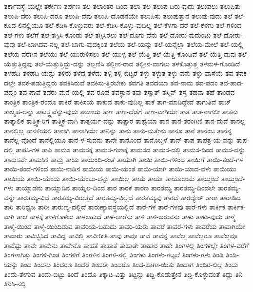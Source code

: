 {ತರ್ಕಾವಸ್ಥೆ-ಯಲ್ಲೇ
ತರ್ಕೇಣ
ತರ್ಪಣ
ತಲ-ತಲಾಂತರ-ದಿಂದ
ತಲಾ-ತಲ
ತಲುಪ-ದಿರು-ವುದು
ತಲುಪಲು
ತಲುಪಿತು
ತಲುಪಿ-ದರು
ತಲುಪಿ-ದರೂ
ತಲುಪಿ-ದೆವು
ತಲುಪಿ-ದೊಡನೆಯೇ
ತಲುಪಿಸು
ತಲುಪುತ್ತಾನೆ
ತಲುಪು-ವುದು
ತಲೆ
ತಲೆ-ಕೂದ-ಲಿನಲ್ಲಿಯೂ
ತಲೆ-ಕೆಡಿಸಿ-ಕೊಳ್ಳುವರು
ತಲೆ-ಕೆಡಿಸಿ-ಕೊಳ್ಳು-ವುದಿಲ್ಲ
ತಲೆ-ಕೆಳಗಾ-ದರೆ
ತಲೆ-ಕೆಳಗು
ತಲೆ-ಗಳಿಂದ
ತಲೆ-ಗಳು
ತಲೆಗೆ
ತಲೆ-ತಗ್ಗಿಸಿ-ಕೊಂಡು
ತಲೆ-ತಗ್ಗಿಸಿರಲು
ತಲೆ-ದೂಗು-ವೆನು
ತಲೆ-ದೋರು-ವುದುಂಟು
ತಲೆ-ದೋರು-ವುವು
ತಲೆ-ಬಾಗಿದವ-ನಲ್ಲ
ತಲೆ-ಬಾಗು-ವುದಕ್ಕಿಂತ
ತಲೆಯ
ತಲೆ-ಯನ್ನು
ತಲೆ-ಯನ್ನೆಲ್ಲಾ
ತಲೆಯ-ಮೇಲೆ
ತಲೆ-ಯಲ್ಲಿ
ತಲೆಯ-ವರೆಗಿನ
ತಲೆಯು
ತಲೆ-ಯುರುಳಿಸಲು
ತಲೆ-ಯುಳ್ಳ
ತಲೆ-ಯೆತ್ತಿ
ತಲೆ-ಯೆತ್ತಿ-ಕೊಂಡಿವೆ
ತಲೆ-ಯೆತ್ತಿ-ದುವು
ತಲೆ-ಯೆತ್ತುತ್ತಿದ್ದವು
ತಲೆ-ಯೆತ್ತುತ್ತಿದ್ದು-ದನ್ನು
ತಲ್ಲಣಿಸಿ
ತಲ್ಲೀನ-ರಾದ
ತಲ್ಲೀನ-ವಾಗಲು
ತಳಕೊತ್ತುತ್ತ
ತಳಮಳ-ಗೊಂಡಿದೆ
ತಳಹದಿ
ತಳಹದಿ-ಯನ್ನು
ತಳಿರು
ತಳೆದ
ತಳೆದು
ತಳ್ಳಿ
ತಳ್ಳಿ-ಬಿಟ್ಟರೆ
ತಳ್ಳು
ತಳ್ಳುತ
ತಳ್ಳು-ವನು
ತಳ್ಳು-ವಾಸೆಯೆ
ತವ
ತವಕ-ದಲ್ಲೇ
ತವಕ-ಪಡುತ್ತಿದ್ದರು
ತವಕಿಸಿರುವೆ
ತವಕಿಸು-ತ್ತಿರಬೇಕು
ತವಗತಿ
ತವದಯಾ
ತವ-ನಾಮ
ತವ-ಪದಂ
ತವ-ಪಾದ-ಪದ್ಮಂ
ತವ-ಪಾವೆ
ತವರು-ಮನೆ-ಯಲ್ಲಿ
ತವ-ರೂಪ
ತವಸ್ಥಾನ
ತವು
ತಸ್ಮಾತ್
ತಸ್ಮಿನ್
ತಸ್ಯ
ತಹನಾ
ತಹೆ
ತಾಂಡವ
ತಾಂತ್ರಿಕ
ತಾಂತ್ರಿಕ-ರೆಂದೂ
ತಾಕಿರೆ
ತಾಕಿಸಯ
ತಾಕುವ
ತಾಕು-ವುದಿಲ್ಲ
ತಾಕೆ
ತಾಗ-ಮಾಡಿದ್ದೇವೆ
ತಾಗುತಿವೆ
ತಾಜ್
ತಾಜ್ಮಹ-ಲನ್ನು
ತಾಟಸ್ಥ್ಯವೆನ್ನು-ವುದು
ತಾಡಾಯ
ತಾಣ
ತಾಣ-ದೆಡೆಗೆ
ತಾಣ-ವಾಗಿಯೇ
ತಾತ
ತಾತ-ನಾಗಲೀ
ತಾತನು
ತಾತ್ಕಾಲಿಕ
ತಾತ್ತ್ವಿಕ-ರಿಗೆ
ತಾತ್ತ್ವಿಕ-ವಾಗಿ
ತಾತ್ಪರ್ಯ-ವನ್ನು
ತಾತ್ಸಾರ
ತಾಥೈಯಾ
ತಾನ
ತಾನ-ತರಂಗಿಣಿ
ತಾನ-ದುವೆ
ತಾನಲ್ಲ
ತಾನಲ್ಲಿಲ್ಲ
ತಾನಳಿಯಲಿ
ತಾನಾಗಿ
ತಾನಾಗಿಯೇ
ತಾನಿನ್ನು
ತಾನು
ತಾನು-ಮತ್ತೇನು
ತಾನೂ
ತಾನೆ
ತಾನೆಂಬ
ತಾನೆನ್ನ
ತಾನೆಲ್ಲ-ವೊಂದೆ
ತಾನೆಲ್ಲಿಯೂ
ತಾನೆ-ಳ-ಸುವನು
ತಾನೇ
ತಾನೊಂದೆ
ತಾನೊಬ್ಬಳೆ
ತಾನ್
ತಾಪ
ತಾಪತ್ರ-ಯ-ವನ್ನು
ತಾಪ-ದಲ್ಲಿ
ತಾಪಸಿ-ಗಳ
ತಾಪಿ
ತಾಮಸ
ತಾಮಸಕ್ಕೆ
ತಾಮಸ-ಗುಣಕ್ಕೆ
ತಾಮಸದ
ತಾಮಸ-ದಲ್ಲಿ
ತಾಮಸ-ದಿಂದ
ತಾಮಸ-ವನ್ನು
ತಾಮಸವೇ
ತಾಮಸಿಕ
ತಾಮ್ರ
ತಾಯ
ತಾಯಂದಿ-ರಂತೆ
ತಾಯಾಗಿ
ತಾಯಿ
ತಾಯಿ-ಗಳಿಂದ
ತಾಯಿಗೆ
ತಾಯಿ-ತಂದೆ-ಗಳ
ತಾಯಿ-ತಂದೆ-ಗಳಿಂದ
ತಾಯಿ-ನಾಡಿನ
ತಾಯಿಯ
ತಾಯಿ-ಯಂತೆ
ತಾಯಿ-ಯಾಗಿ
ತಾಯಿ-ಯಾದ-ವಳು
ತಾಯಿಯು
ತಾಯಿಯೆ
ತಾಯಿ-ಯೆಂದು
ತಾಯಿ-ಯೆಂಬು-ದನ್ನು
ತಾಯಿಲ್ಲ
ತಾಯೆ
ತಾಯೇ
ತಾಯೊಲುಮೆ
ತಾಯ್ತಂದೆ
ತಾಯ್ತಂದೆ-ಗಳು
ತಾಯ್ನಾಡನು
ತಾಯ್ನಾಡಿನ
ತಾಯ್ನೆಲ-ದಿಂದ
ತಾರ
ತಾರಕೆ
ತಾರಣ
ತಾರತಮ್ಯ
ತಾರತಮ್ಯ-ದಿಂದಲೇ
ತಾರತಮ್ಯ-ವನ್ನೇ
ತಾರತಮ್ಯ-ವಿದೆ
ತಾರತಮ್ಯ-ವಿರುತ್ತದೆ
ತಾರತಮ್ಯ-ವಿಲ್ಲದೆ
ತಾರತಮ್ಯವು
ತಾರದೆ
ತಾರಲ್ಯೇರ್
ತಾರಾ
ತಾರಾಡಿದ
ತಾರಿ
ತಾರಿಧ್ವಜ
ತಾರೀ
ತಾರುಣ್ಯ-ದಲ್ಲಿದೆ
ತಾರುಣ್ಯಾವಸ್ಥೆಯಲ್ಲಿದೆ
ತಾರೆ-ಗಳ
ತಾರೆ-ಗಳವು
ತಾರೆ-ಗಳು
ತಾರ್ಕಿಕ
ತಾರ್ಕಿಕ-ವಾಗಿ
ತಾಲ
ತಾಳಕ್ಕೆ
ತಾಳಗೊಳಲು
ತಾಳಲಹುದೆ
ತಾಳ-ಲಾರೆನು
ತಾಳಿ
ತಾಳಿ-ಬರುವನು
ತಾಳು
ತಾಳು-ವುದು
ತಾಳ್ಮೆ
ತಾಳ್ಮೆ-ಯಿಂದ
ತಾಳ್ಮೆ-ಯಿಂದಿಡುವ
ತಾವರಿಯ-ಬಹುದು
ತಾವರಿ-ಯರು
ತಾವರೆ
ತಾವರೆ-ಗಳು
ತಾವರೆಯ
ತಾವಾಗಿಯೇ
ತಾವಾರು
ತಾವಿಚ್ಛಿಸಿದ
ತಾವಿದ್ದ
ತಾವಿಲ್ಲಿ
ತಾವೀರೀತಿ
ತಾವು
ತಾವೂ
ತಾವೆ
ತಾವೆನ್ನ
ತಾವೆಲ್ಲ
ತಾವೆಲ್ಲರೂ
ತಾವೆಲ್ಲವೂ
ತಾವೆಷ್ಟು
ತಾವೇ
ತಾವೇನು
ತಾವೇನೊ
ತಾಹತೆ
ತಾಹಾತೆ
ತಾಹಾತೇ
ತಾಹಾರ
ತಾಹೇ
ತಿಂಗಳಲ್ಲಿ
ತಿಂಗಳಲ್ಲೇ
ತಿಂಗಳ-ವರೆಗೆ
ತಿಂಗಳಾಗಿತ್ತು
ತಿಂಗಳಿ-ಗಿಂತ
ತಿಂಗಳಿಗೆ
ತಿಂಗಳಿನ
ತಿಂಗಳಿ-ನಲ್ಲಿ
ತಿಂಗಳು
ತಿಂಗಳು-ಗಟ್ಟಲೆ
ತಿಂಗಳು-ಗಳು
ತಿಂಡಿ
ತಿಂಡಿ-ಯನ್ನು
ತಿಂದ
ತಿಂದನು
ತಿಂದರೂ
ತಿಂದರೆ
ತಿಂದರೇ
ತಿಂದರೊ
ತಿಂದ-ಹಾಗಾ-ಯಿತು
ತಿಂದಾಗ
ತಿಂದಿರ-ಲಿಲ್ಲ
ತಿಂದು
ತಿಂದು-ತೇಗುವ
ತಿಂದು-ಬಿಟ್ಟು
ತಿಂದೆ
ತಿಂದೊ
ತಿಕ್ಕಾಟ-ವಿತ್ತು
ತಿಟ್ಟನ್ನು
ತಿದ್ದಿ-ಕೊಡುತ್ತೇನೆ
ತಿದ್ದಿ-ಕೊಳ್ಳುವಂತೆ
ತಿದ್ದು
ತಿನಿ
ತಿನಿಸಿ-ನಲ್ಲಿ
}
